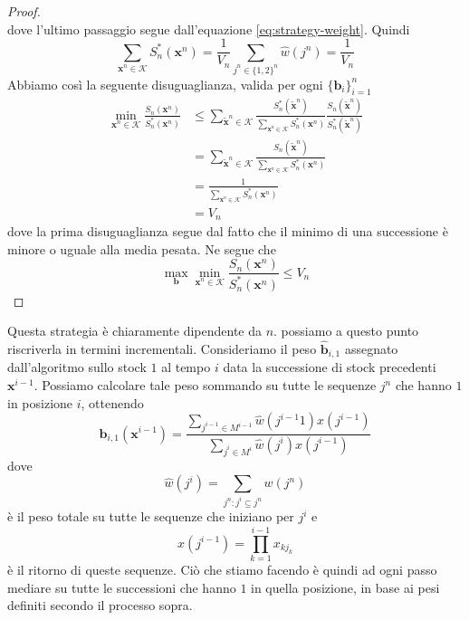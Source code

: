 \documentclass[a4paper,11pt]{book}
\theoremstyle{plain}
\theoremstyle{definition}
\theoremstyle{remark}
\newcommand{\x}{\bm{x}}
\newcommand{\B}{\bm{b}}
\newcommand{\bh}{\hat{\bm{b}}}
\begin{document}
\begin{proof}
\begin{equation*}
	\end{equation*}
	dove l'ultimo passaggio segue dall'equazione \ref{eq:strategy-weight}. Quindi
	\begin{equation*}
		\sum_{\x^n\in\mathcal{K}}{S_n^*(\x^n)}=\frac{1}{V_n}\sum_{j^n\in\{1,2\}^n}{\hat{w}(j^n)}=\frac{1}{V_n}
	\end{equation*}
	Abbiamo così la seguente disuguaglianza, valida per ogni $\{ \B_i\}_{i=1}^n$
	\begin{equation*}
		\begin{split}
		\min\limits_{\x^n\in\mathcal{K}}\frac{S_n(\x^n)}{S_n^*(\x^n)}& \leq \sum_{\tilde{\x}^n\in\mathcal{K}}\frac{S_n^*(\tilde{\x}^n)}{\sum_{\x^n\in\mathcal{K}}{S_n^*(\x^n)}}\frac{S_n(\tilde{\x}^n)}{S_n^*(\tilde{\x}^n)}\\
		& = \sum_{\tilde{\x}^n\in\mathcal{K}}{\frac{S_n(\tilde{\x}^n)}{\sum_{\x^n\in\mathcal{K}}{S_n^*(\x^n)}}}\\
		& = \frac{1}{\sum_{\x^n\in\mathcal{K}}{S_n^*(\x^n)}}\\
		& = V_n
		\end{split}
	\end{equation*}
	dove la prima disuguaglianza segue dal fatto che il minimo di una successione è minore o uguale alla media pesata. 
	Ne segue che
	\begin{equation*}
		\max\limits_{\bm{b}}\min\limits_{\x^n\in\mathcal{K}}\frac{S_n(\x^n)}{S_n^*(\x^n)}\leq V_n
	\end{equation*}
\end{proof}
Questa strategia è chiaramente dipendente da $n$. possiamo a questo punto riscriverla in termini incrementali. Consideriamo il peso $\bh_{i,1}$ assegnato dall'algoritmo sullo stock $1$ al tempo $i$ data la successione di stock precedenti $\x^{i-1}$. Possiamo calcolare tale peso sommando su tutte le sequenze $j^n$ che hanno $1$ in posizione $i$, ottenendo
\begin{equation*}
	\hat{\B}_{i,1}(\x^{i-1}) = \frac{\sum_{j^{i-1}\in M^{i-1}}{\hat{w}(j^{i-1}1)}x(j^{i-1})}{\sum_{j^{i}\in M^{i}}{\hat{w}(j^i)x(j^{i-1})}}
\end{equation*}
dove
\begin{equation*}
	\hat{w}(j^i) = \sum_{j^n:j^i\subseteq j^n}{w(j^n)}
\end{equation*}
è il peso totale su tutte le sequenze che iniziano per $j^i$ e 
\begin{equation*}
	x(j^{i-1})=\prod_{k = 1}^{i-1}{x_{kj_k}}
\end{equation*}
è il ritorno di queste sequenze. Ciò che stiamo facendo è quindi ad ogni passo mediare su tutte le successioni che hanno $1$ in quella posizione, in base ai pesi definiti secondo il processo sopra.\newline
\end{document}
